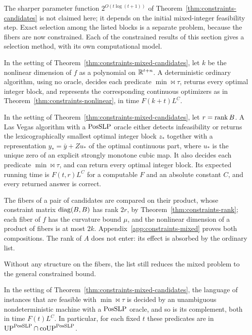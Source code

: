 The sharper parameter function $2^{O(t\log(t+1))}$ of
Theorem~\ref{thm:constraints-candidates} is not claimed here; it depends on the
initial mixed-integer feasibility step. Exact selection among the listed
blocks is a separate problem, because the fibers are now constrained. Each of
the constrained results of this section gives a selection method, with its own
computational model.

\begin{corollary}
\label{cor:constraints-nonlinear-mixed}
In the setting of Theorem~\ref{thm:constraints-mixed-candidates}, let $k$ be
the nonlinear dimension of $f$ as a polynomial on $\mathbb R^{t+n}$. A deterministic
ordinary algorithm, using no oracle, decides each predicate $\min\bowtie\tau$,
returns every optimal integer block, and represents the corresponding
continuous optimizers as in Theorem~\ref{thm:constraints-nonlinear}, in time
$F(k+t)L^{C}$.
\end{corollary}

\begin{theorem}
\label{thm:constraints-mixed-rank}
In the setting of Theorem~\ref{thm:constraints-mixed-candidates}, let
$r=\operatorname{rank} B$. A Las Vegas algorithm with a $\mathrm{PosSLP}$ oracle either detects
infeasibility or returns the lexicographically smallest optimal integer block
$z_*$ together with a representation $y_*=\bar y+Zu_*$ of the optimal
continuous part, where $u_*$ is the unique zero of an explicit strongly
monotone cubic map. It also decides each predicate $\min\bowtie\tau$, and can
return every optimal integer block. Its expected running time is
$F(t,r)L^{C}$ for a computable $F$ and an absolute constant $C$, and every
returned answer is correct.
\end{theorem}

The fibers of a pair of candidates are compared on their product, whose
constraint matrix $\operatorname{diag}(B,B)$ has rank $2r$, by
Theorem~\ref{thm:constraints-rank}; each fiber of $f$ has the curvature bound
$\mu$, and the nonlinear dimension of a product of fibers is at most $2k$.
Appendix~\ref{app:constraints-mixed} proves both compositions. The rank of
$A$ does not enter: its effect is absorbed by the ordinary list.

Without any structure on the fibers, the list still reduces the mixed problem
to the general constrained bound.

\begin{corollary}
\label{cor:constraints-mixed-unambiguous}
In the setting of Theorem~\ref{thm:constraints-mixed-candidates}, the language
of instances that are feasible with $\min\bowtie\tau$ is decided by an
unambiguous nondeterministic machine with a $\mathrm{PosSLP}$ oracle, and so is its
complement, both in time $F(t)L^{C}$. In particular, for each fixed $t$ these
predicates are in $\mathrm{UP}^{\mathrm{PosSLP}}\cap\mathrm{coUP}^{\mathrm{PosSLP}}$.
\end{corollary}

